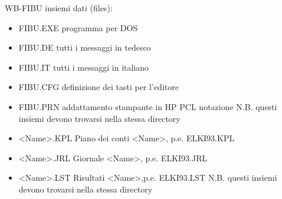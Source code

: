 \documentclass[12pt]{report}
\begin{document}
WB-FIBU insiemi dati (files):
\begin{itemize}
\item FIBU.EXE   programma per DOS
\item FIBU.DE    tutti i messaggi in tedesco
\item FIBU.IT    tutti i messaggi in italiano
\item FIBU.CFG   definizione dei tasti per l'editore
\item FIBU.PRN   addattamento stampante in HP PCL notazione
     N.B. questi insiemi devono trovarsi nella stessa directory

\item <Name>.KPL  Piano dei conti <Name>, p.e. ELKI93.KPL
\item <Name>.JRL  Giornale        <Name>, p.e. ELKI93.JRL
\item <Name>.LST  Risultati        <Name>,p.e. ELKI93.LST
     N.B. questi insiemi devono trovarsi nella stessa directory
\end{itemize}
\end{document}
